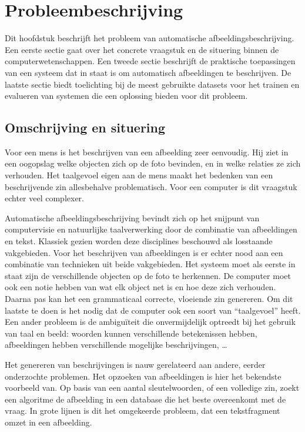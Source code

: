 \chapter{Probleembeschrijving}
\label{chap:Probleembeschrijving}

Dit hoofdstuk beschrijft het probleem van automatische afbeeldingsbeschrijving. Een eerste sectie gaat over het concrete vraagstuk en de situering binnen de computerwetenschappen. Een tweede sectie beschrijft de praktische toepassingen van een systeem dat in staat is om automatisch afbeeldingen te beschrijven. De laatste sectie biedt toelichting bij de meest gebruikte datasets voor het trainen en evalueren van systemen die een oplossing bieden voor dit probleem.

\section{Omschrijving en situering}
\label{sec:Omschrijving en situering}
Voor een mens is het beschrijven van een afbeelding zeer eenvoudig. Hij ziet in een oogopslag welke objecten zich op de foto bevinden, en in welke relaties ze zich verhouden. Het taalgevoel eigen aan de mens maakt het bedenken van een beschrijvende zin allesbehalve problematisch.
Voor een computer is dit vraagstuk echter veel complexer.

Automatische afbeeldingsbeschrijving bevindt zich op het snijpunt van computervisie en natuurlijke taalverwerking door de combinatie van afbeeldingen en tekst. Klassiek gezien worden deze disciplines beschouwd als losstaande vakgebieden. Voor het beschrijven van afbeeldingen is er echter nood aan een combinatie van technieken uit beide vakgebieden. Het systeem moet als eerste in staat zijn de verschillende objecten op de foto te herkennen. De computer moet ook een notie hebben van wat elk object net is en hoe deze zich verhouden. Daarna pas kan het een grammaticaal correcte, vloeiende zin genereren. Om dit laatste te doen is het nodig dat de computer ook een soort van ``taalgevoel'' heeft. Een ander probleem is de ambigu\"iteit die onvermijdelijk optreedt bij het gebruik van taal en beeld: woorden kunnen verschillende betekenissen hebben, afbeeldingen hebben verschillende mogelijke beschrijvingen, \ldots

Het genereren van beschrijvingen is nauw gerelateerd aan andere, eerder onderzochte problemen. Het opzoeken van afbeeldingen is hier het bekendste voorbeeld van. Op basis van een aantal sleutelwoorden, of een volledige zin, zoekt een algoritme de afbeelding in een database die het beste overeenkomt met de vraag. In grote lijnen is dit het omgekeerde probleem, dat een tekstfragment omzet in een afbeelding.


